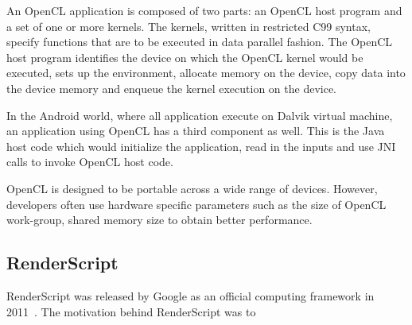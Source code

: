 An OpenCL application is composed of two parts: an OpenCL host program and a
set of one or more kernels. The kernels, written in restricted C99 syntax,
specify functions that are to be executed in data parallel fashion. The OpenCL
host program identifies the device on which the OpenCL kernel would be
executed, sets up the environment, allocate memory on the device, copy data
into the device memory and enqueue the kernel execution on the device.

In the Android world, where all application execute on Dalvik virtual machine,
an application using OpenCL has a third component as well. This is the Java
host code which would initialize the application, read in the inputs and use
JNI calls to invoke OpenCL host code.

OpenCL is designed to be portable across a wide range of devices. However,
developers often use hardware specific parameters such as the size of OpenCL
work-group, shared memory size to obtain better performance.
\subsection{RenderScript}
RenderScript was released by Google as an official computing framework in 2011~\cite{RederScript:url}. The motivation behind RenderScript was to 

